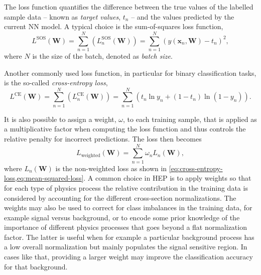 The loss function quantifies the difference between the true values of the labelled sample data -- known as \emph{target values}, $t_n$ -- and the values predicted by the current NN model. A typical choice is the sum-of-squares loss function,
\begin{equation}
    \label{eq:mean-squared-loss}
   L^{\text{SOS}}(\mathbf{W}) = \sum _{n=1}^{N}\left(L_n^{\text{SOS}}(\mathbf{W}) \right) = \sum _{n=1}^{N}\left( y(\mathbf{x}_n, \mathbf{W})-t_n \right)^{2},
\end{equation}
where $N$ is the size of the batch, denoted as \emph{batch size}. 

Another commonly used loss function, in particular for binary classification tasks, is the so-called \emph{cross-entropy loss},
\begin{equation}
    \label{eq:cross-entropy-loss}
    L^{\text{CE}}(\mathbf{W}) = \sum _{n=1}^{N}\left(L_n^{\text{CE}}(\mathbf{W}) \right) = \sum _{n=1}^{N}\left( t_n \ln y_n + ( 1 - t_n) \ln (1 - y_n) \right).
\end{equation}

It is also possible to assign a weight, $\omega$, to each training sample, that is applied as a multiplicative factor when computing the loss function and thus controls the relative penalty for incorrect predictions. The loss then becomes
\begin{equation}
    L_{\text{weighted}}(\mathbf{W}) = \sum _{n=1}^{N} \omega_n L_n(\mathbf{W}), 
\end{equation}
where $L_n(\mathbf{W})$ is the non-weighted loss as shown in \cref{eq:cross-entropy-loss,eq:mean-squared-loss}. 
A common choice in HEP is to apply weights so that for each type of physics process the relative contribution in the training data is considered by accounting for the different cross-section normalizations.
The weights may also be used to correct for class imbalances in the training data, for example signal versus background, or to encode some prior knowledge of the importance of different physics processes that goes beyond a flat normalization factor. The latter is useful when for example a particular background process has a low overall normalization but mainly populates the signal sensitive region. In cases like that, providing a larger weight may improve the classification accuracy for that background. 


